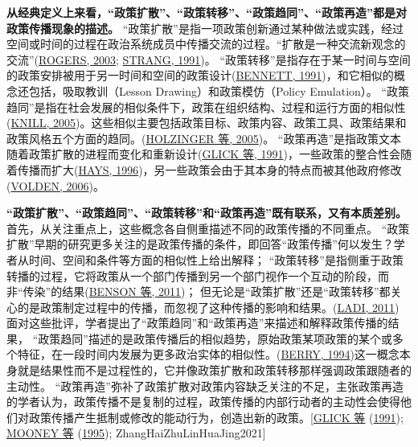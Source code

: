 \documentclass[
  12pt,
]{ctexart}
\begin{document}
\textbf{从经典定义上来看，``政策扩散''、``政策转移''、``政策趋同''、``政策再造''都是对政策传播现象的描述。}
``政策扩散''是指一项政策创新通过某种做法或实践，经过空间或时间的过程在政治系统成员中传播交流的过程。``扩散是一种交流新观念的交流''(\protect\hyperlink{ref-Rogers2003}{ROGERS, 2003}; \protect\hyperlink{ref-STRANG1991}{STRANG, 1991})。
``政策转移''是指存在于某一时间与空间的政策安排被用于另一时间和空间的政策设计(\protect\hyperlink{ref-Bennett1991}{BENNETT, 1991})，和它相似的概念还包括，吸取教训（Lesson Drawing）和政策模仿（Policy Emulation）。
``政策趋同''是指在社会发展的相似条件下，政策在组织结构、过程和运行方面的相似性(\protect\hyperlink{ref-Knill2005}{KNILL, 2005})。这些相似主要包括政策目标、政策内容、政策工具、政策结果和政策风格五个方面的趋同。(\protect\hyperlink{ref-HolzingerKnill2005}{HOLZINGER 等, 2005})。
``政策再造''是指政策文本随着政策扩散的进程而变化和重新设计(\protect\hyperlink{ref-GlickHays1991}{GLICK 等, 1991})，一些政策的整合性会随着传播而扩大(\protect\hyperlink{ref-Hays1996}{HAYS, 1996})，另一些政策会由于其本身的特点而被其他政府修改(\protect\hyperlink{ref-Volden2006}{VOLDEN, 2006})。

\textbf{``政策扩散''、``政策趋同''、``政策转移''和``政策再造''既有联系，又有本质差别。}
首先，从关注重点上，这些概念各自侧重描述不同的政策传播的不同重点。
``政策扩散''早期的研究更多关注的是政策传播的条件，即回答``政策传播''何以发生？学者从时间、空间和条件等方面的相似性上给出解释；
``政策转移''是指侧重于政策转播的过程，它将政策从一个部门传播到另一个部门视作一个互动的阶段，而非``传染''的结果(\protect\hyperlink{ref-BensonJordan2011}{BENSON 等, 2011})；
但无论是``政策扩散''还是``政策转移''都关心的是政策制定过程中的传播，而忽视了这种传播的影响和结果。(\protect\hyperlink{ref-Ladi2011}{LADI, 2011})
面对这些批评，学者提出了``政策趋同''和``政策再造''来描述和解释政策传播的结果，
``政策趋同''描述的是政策传播后的相似趋势，原始政策某项政策的某个或多个特征，在一段时间内发展为更多政治实体的相似性。(\protect\hyperlink{ref-Berry1994}{BERRY, 1994})这一概念本身就是结果性而不是过程性的，它并像政策扩散和政策转移那样强调政策跟随者的主动性。
``政策再造''弥补了政策扩散对政策内容缺乏关注的不足，主张政策再造的学者认为，政策传播不是复制的过程，政策传播的内部行动者的主动性会使得他们对政策传播产生抵制或修改的能动行为，创造出新的政策。{[}\protect\hyperlink{ref-GlickHays1991}{GLICK 等} (\protect\hyperlink{ref-GlickHays1991}{1991}); \protect\hyperlink{ref-MooneyLee1995}{MOONEY 等} (\protect\hyperlink{ref-MooneyLee1995}{1995}); ZhangHaiZhuLinHuaJing2021{]}
\end{document}

